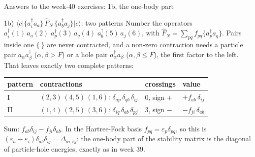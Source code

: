\documentclass[aspectratio=169,10pt]{beamer}
\newcommand{\element}[3]{\langle #1\vert #2\vert #3\rangle}
\newcommand{\nc}[1]{\bigl\{#1\bigr\}}
\begin{document}
\begin{frame}{Answers to the week-40 exercises: 1b, the one-body part}
  \footnotesize
  \begin{block}{1b) $\element{c}{\nc{a_i^{\dagger}a_a}\,\hat F_N\,\nc{a_b^{\dagger}a_j}}{c}$: two patterns}
    Number the operators $a_i^{\dagger}(1)\,a_a(2)\;a_p^{\dagger}(3)\,a_q(4)\;a_b^{\dagger}(5)\,a_j(6)$, with $\hat F_N=\sum_{pq}f_{pq}\nc{a_p^{\dagger}a_q}$. Pairs inside one $\nc{\ }$ are never contracted, and a non-zero contraction needs a particle pair $a_\alpha a_\beta^{\dagger}$ ($\alpha,\beta>F$) or a hole pair $a_\alpha^{\dagger}a_\beta$ ($\alpha,\beta\le F$), the first factor to the left. That leaves exactly two complete patterns:
    \begin{center}
    \begin{tabular}{@{}llll@{}}\toprule
      pattern & contractions & crossings & value\\\midrule
      I  & $(2,3)\,(4,5)\,(1,6)$: $\delta_{ap}\,\delta_{qb}\,\delta_{ij}$ & $0$, sign $+$ & $+f_{ab}\,\delta_{ij}$\\
      II & $(1,4)\,(2,5)\,(3,6)$: $\delta_{iq}\,\delta_{ab}\,\delta_{pj}$ & $3$, sign $-$ & $-f_{ji}\,\delta_{ab}$\\\bottomrule
    \end{tabular}
    \end{center}
    Sum: $f_{ab}\delta_{ij}-f_{ji}\delta_{ab}$. In the Hartree-Fock basis $f_{pq}=\varepsilon_p\delta_{pq}$, so this is $(\varepsilon_a-\varepsilon_i)\delta_{ab}\delta_{ij}=\Delta_{ai,bj}$: the one-body part of the stability matrix is the diagonal of particle-hole energies, exactly as in week 39.
  \end{block}
\end{frame}
\end{document}
